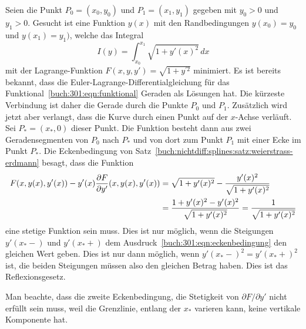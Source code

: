 \begin{loesung}
Seien die Punkt $P_0=(x_0,y_0)$ und $P_1=(x_1,y_1)$ gegeben mit $y_0>0$
und $y_1>0$.
Gesucht ist eine Funktion $y(x)$ mit den Randbedingungen $y(x_0)=y_0$
und $y(x_1)=y_1)$, welche das Integral
\begin{equation}
I(y)
=
\int_{x_0}^{x_1} \sqrt{1+y'(x)^2}\,dx
\label{buch:301:eqn:funktional}
\end{equation}
mit der Lagrange-Funktion $F(x,y,y') = \sqrt{1+y^{\prime 2}}$
minimiert.
Es ist bereits bekannt, dass die Euler-Lagrange-Differentialgleichung
für das Funktional~\eqref{buch:301:eqn:funktional} Geraden als
Lösungen hat.
Die kürzeste Verbindung ist daher die Gerade durch die Punkte $P_0$ und
$P_1$.
Zusätzlich wird jetzt aber verlangt, dass die Kurve durch einen Punkt
auf der $x$-Achse verläuft.
Sei $P_*=(x_*,0)$ dieser Punkt.
Die Funktion besteht dann aus zwei Geradensegmenten von $P_0$ nach
$P_*$ und von dort zum Punkt $P_1$ mit einer Ecke im Punkt $P_*$.
Die Eckenbedingung von
Satz~\ref{buch:nichtdiff:splines:satz:weierstrass-erdmann}
besagt, dass  die Funktion
\begin{align}
F(x,y(x),y'(x))
-
y'(x)
\frac{\partial F}{\partial y'}
(x,y(x),y'(x))
&=
\sqrt{1+y'(x)^2}
-
\frac{y'(x)^2}{\sqrt{1+y'(x)^2}}
\notag
\\
&=
\frac{1+y'(x)^2-y'(x)^2}{\sqrt{1+y'(x)^2}}
=
\frac{1}{\sqrt{1+y'(x)^2}}
\label{buch:301:eqn:eckenbedingung}
\end{align}
eine stetige Funktion sein muss.
Dies ist nur möglich, wenn die Steigungen $y'(x_*-)$ und $y'(x_*+)$ dem
Ausdruck~\eqref{buch:301:eqn:eckenbedingung} den gleichen Wert geben.
Dies ist nur dann möglich, wenn $y'(x_*-)^2=y'(x_*+)^2$ ist, die
beiden Steigungen müssen also den gleichen Betrag haben.
Dies ist das Reflexionsgesetz.

Man beachte, dass die zweite Eckenbedingung, die Stetigkeit von
$\partial F/\partial y'$ nicht erfüllt sein muss, weil die Grenzlinie,
entlang der $x_*$ varieren kann, keine vertikale Komponente hat.
\end{loesung}



